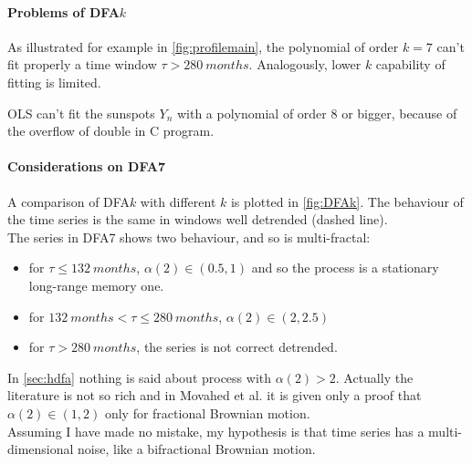 \paragraph{Problems of DFA$k$}
As illustrated for example in \autoref{fig:profilemain}, the polynomial of order $k=7$ can't fit properly a time window $\tau > \SI{280}{months}$. Analogously, lower $k$ capability of fitting is limited. 

OLS can't fit the sunspots $Y_n$ with a polynomial of order 8 or bigger, because of the overflow of double in C program.

\paragraph{Considerations on DFA7}
A comparison of DFA$k$ with different $k$ is plotted in \autoref{fig:DFAk}. 
The behaviour of the time series is the same in windows well detrended (dashed line).\\ 
The series in DFA7 shows two behaviour, and so is multi-fractal:
\begin{itemize}
	\item for $\tau \le \SI{132}{months}$, $\alpha(2) \in (0.5, 1)$ and so the process is a stationary long-range memory one.
	\item for $\SI{132}{months} < \tau \le \SI{280}{months}$, $\alpha(2) \in (2, 2.5)$ 
	\item for $\tau > \SI{280}{months}$, the series is not correct detrended.
\end{itemize}

In \autoref{sec:hdfa} nothing is said about process with $\alpha(2)>2$. Actually the literature is not so rich and in Movahed et al. \cite{Movahed_2006} it is given only a proof that $\alpha(2) \in (1, 2)$ only for fractional Brownian motion.\\
Assuming I have made no mistake, my hypothesis is that time series has a multi-dimensional noise, like a bifractional Brownian motion.

